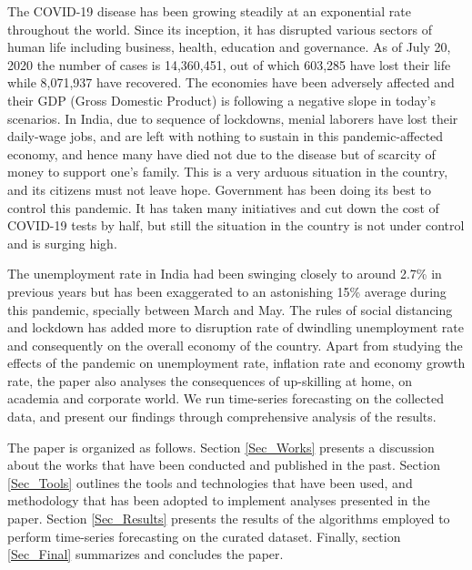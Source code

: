 \documentclass[10pt,journal,compsoc]{IEEEtran}
\begin{document}
The COVID-19 disease has been growing steadily at an exponential rate throughout the world. Since its inception, it has disrupted various sectors of human life including business, health, education and governance. As of July 20, 2020 the number of cases is 14,360,451, out of which 603,285 have lost their life while 8,071,937 have recovered. The economies have been adversely affected and their GDP (Gross Domestic Product) is following a negative slope in today's scenarios. In India, due to sequence of lockdowns, menial laborers have lost their daily-wage jobs, and are left with nothing to sustain in this pandemic-affected economy, and hence many have died not due to the disease but of scarcity of money to support one's family. This is a very arduous situation in the country, and its citizens must not leave hope. Government has been doing its best to control this pandemic. It has taken many initiatives and cut down the cost of COVID-19 tests by half, but still the situation in the country is not under control and is surging high. 

The unemployment rate in India had been swinging closely to around 2.7\% in previous years but has been exaggerated to an astonishing 15\% average during this pandemic, specially between March and May. The rules of social distancing and lockdown has added more to disruption rate of dwindling unemployment rate and consequently on the overall economy of the country. Apart from studying the effects of the pandemic on unemployment rate, inflation rate and economy growth rate, the paper also analyses the consequences of up-skilling at home, on academia and corporate world.  We run time-series forecasting on the collected data, and present our findings through comprehensive analysis of the results.

The paper is organized as follows. Section \ref{Sec_Works} presents a discussion about the works that have been conducted and published in the past. Section \ref{Sec_Tools} outlines the tools and technologies that have been used, and methodology that has been adopted to implement analyses presented in the paper. Section \ref{Sec_Results} presents the results of the algorithms employed to perform time-series forecasting on the curated dataset. Finally, section \ref{Sec_Final} summarizes and concludes the paper.   
\end{document}
